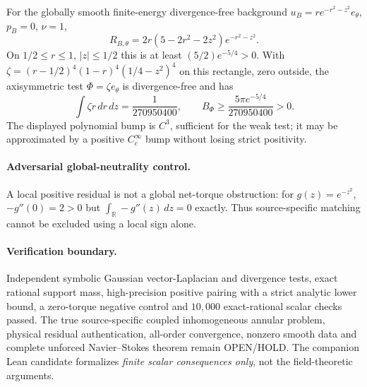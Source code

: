 \begin{proposition}
For the globally smooth finite-energy divergence-free
background $u_B=r e^{-r^2-z^2}e_\theta$, $p_B=0$, $\nu=1$,
\[
R_{B,\theta}=
2r(5-2r^2-2z^2)e^{-r^2-z^2}.
\]
On $1/2\le r\le1$, $|z|\le1/2$ this is
at least $(5/2)e^{-5/4}>0$.
With
$\zeta=(r-1/2)^4(1-r)^4(1/4-z^2)^4$
on this rectangle, zero outside, the axisymmetric test
$\Phi=\zeta e_\theta$ is divergence-free and has
\[
\int\zeta r\,dr\,dz=\frac{1}{270950400},\qquad
\boxed{B_\Phi\ge
\frac{5\pi e^{-5/4}}{270950400}>0.}
\]
The displayed polynomial bump is $C^3$, sufficient for the
weak test; it may be approximated by a positive $C_c^\infty$
bump without losing strict positivity.
\end{proposition}
\paragraph{Adversarial global-neutrality control.}
A local positive residual is not a global net-torque
obstruction: for $g(z)=e^{-z^2}$,
$-g''(0)=2>0$ but
$\int_{\mathbb R}-g''(z)\,dz=0$ exactly.
Thus source-specific matching cannot be excluded using a
local sign alone.

\paragraph{Verification boundary.}
Independent symbolic Gaussian vector-Laplacian and
divergence tests, exact rational support mass, high-precision
positive pairing with a strict analytic lower bound, a
zero-torque negative control and $10{,}000$ exact-rational
scalar checks passed. The true source-specific coupled
inhomogeneous annular problem, physical residual authentication,
all-order convergence, nonzero smooth data and complete
unforced Navier--Stokes theorem remain OPEN/HOLD.
The companion Lean candidate formalizes \emph{finite scalar
consequences only}, not the field-theoretic arguments.